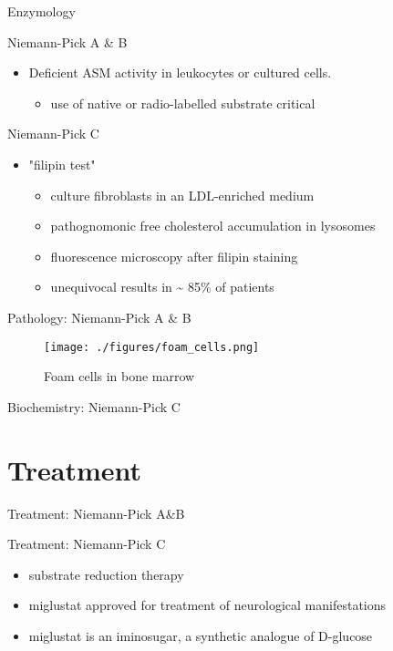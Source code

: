 \documentclass[presentation, smaller]{beamer}
\begin{document}
\begin{frame}[label={sec:orgheadline17}]{Enzymology}
\begin{block}{Niemann-Pick A \& B}
\begin{itemize}
\item Deficient ASM activity in leukocytes or cultured cells.
\begin{itemize}
\item use of native or radio-labelled substrate critical
\end{itemize}
\end{itemize}
\end{block}

\begin{block}{Niemann-Pick C}
\begin{itemize}
\item "filipin test"
\begin{itemize}
\item culture fibroblasts in an LDL-enriched medium
\item pathognomonic free cholesterol accumulation in lysosomes
\item fluorescence microscopy after filipin staining
\item unequivocal results in \textasciitilde{} 85\% of patients
\end{itemize}
\end{itemize}
\end{block}
\end{frame}


\begin{frame}[label={sec:orgheadline18}]{Pathology: Niemann-Pick A \& B}
\begin{figure}[htb]
\centering
\texttt{[image: ./figures/foam\_cells.png]}
\caption{\label{fig:}
Foam cells in bone marrow}
\end{figure}
\end{frame}



\begin{frame}[label={sec:orgheadline19}]{Biochemistry: Niemann-Pick C}
\end{frame}
\section{Treatment}
\label{sec:orgheadline23}


\begin{frame}[label={sec:orgheadline21}]{Treatment: Niemann-Pick A\&B}
\end{frame}


\begin{frame}[label={sec:orgheadline22}]{Treatment: Niemann-Pick C}
\begin{itemize}
\item substrate reduction therapy
\item miglustat approved for treatment of neurological manifestations
\item miglustat is an iminosugar, a synthetic analogue of D-glucose
\end{itemize}
\end{frame}
\end{document}
